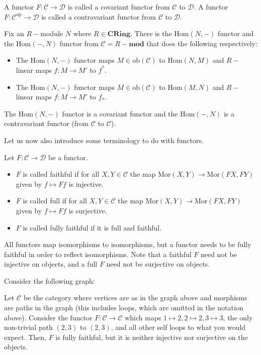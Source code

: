 \documentclass[12pt,reqno]{amsart}
\numberwithin{theorem}{section}
\theoremstyle{definition}
\theoremstyle{remark}
\numberwithin{equation}{section}
\newcommand{\cC}{\mathcal{C}}
\newcommand{\cD}{\mathcal{D}}
\theoremstyle{definition}
\newcommand{\ob}{\mathrm{ob}}
\newcommand{\Mor}{\mathrm{Mor}}
\renewcommand{\hom}{\mathrm{Hom}}
\begin{document}
\begin{definition}
    A functor $F:\cC\rightarrow \cD$ is called a covariant functor from $\cC$ to $\cD$. A functor $F:\cC^{\mathrm{op}}\rightarrow \cD$ is called a contravariant functor from $\cC$ to $\cD$.
\end{definition}
\begin{example}
    Fix an $R-$module $N$ where $R \in \mathbf{CRing}$. There is the $\hom(N,-)$ functor and the $\hom(-,N)$ functor from $\cC=R-\mathbf{mod}$ that does the following respectively:
    \begin{itemize}
        \item The $\hom (N,-)$ functor maps $M \in \ob(\cC)$ to $\hom(N,M)$ and $R-$linear maps $f:M\rightarrow M'$ to $f^*$.
         \item The $\hom (N,-)$ functor maps $M \in \ob(\cC)$ to $\hom(M,N)$ and $R-$linear maps $f:M\rightarrow M'$ to $f_*$.
    \end{itemize}
    The $\hom(N,-)$ functor is a covariant functor and the $\hom(-,N)$ is a contravariant functor (from $\cC$ to $\cC$).
\end{example}
Let us now also introduce some terminology to do with functors.
\begin{definition}
    Let $F:\cC\rightarrow \cD$ be a functor.
    \begin{itemize}
        \item $F$ is called faithful if for all $X,Y \in \cC$ the map $\Mor(X,Y)\rightarrow \Mor(FX,FY)$ given by $f \mapsto Ff$ is injective.
        \item $F$ is called full if for all $X,Y \in \cC$ the map $\Mor(X,Y)\rightarrow \Mor(FX,FY)$ given by $f \mapsto Ff$ is surjective.
        \item $F$ is called fully faithful if it is full and faithful.
    \end{itemize}
\end{definition}
All functors map isomorphisms to isomorphisms, but a functor needs to be fully faithful in order to reflect isomorphisms. Note that a faithful $F$ need not be injective on objects, and a full $F$ need not be surjective on objects.
\begin{example}\label{example2.7}
    Consider the following graph:
    \begin{center}
    \end{center}
    Let $\cC$ be the category where vertices are as in the graph above and morphisms are paths in the graph (this includes loops, which are omitted in the notation above). Consider the functor $F:\cC \rightarrow \cC$ which maps $1\mapsto 2, 2\mapsto 2, 3\mapsto 3$, the only non-trivial path $(2,3)$ to $(2,3)$, and all other self loops to what you would expect. Then, $F$ is fully faithful, but it is neither injective nor surjective on the objects.
\end{example}
\end{document}
